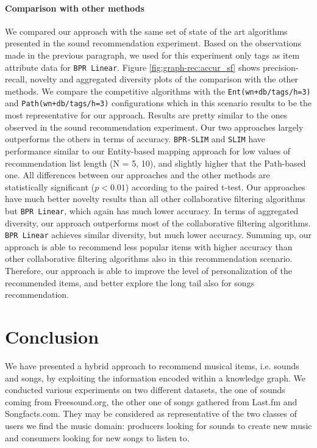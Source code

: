 \paragraph*{\textbf{Comparison with other methods}}\label{comp}
We compared our approach with the same set of state of the art algorithms presented in the sound recommendation experiment. Based on the observations made in the previous paragraph, we used for this experiment only tags as item attribute data for \texttt{BPR Linear}.
Figure \ref{fig:graph-rec:accur_sf} shows precision-recall, novelty and aggregated diversity plots of the comparison with the other methods. We compare the competitive algorithms with the \texttt{Ent(wn+db/tags/h=3)} and \texttt{Path(wn+db/tags/h=3)} configurations which in this scenario results to be the most representative for our approach. 
Results are pretty similar to the ones observed in the sound recommendation experiment. Our two approaches largely outperforms the others in terms of accuracy. \texttt{BPR-SLIM} and \texttt{SLIM} have performance similar to our Entity-based mapping approach for low values of recommendation list length (N = 5, 10), and slightly higher that the Path-based one. All differences between our approaches and the other methods are statistically significant ($p<0.01$) according to the paired t-test. Our approaches have much better novelty results than all other collaborative filtering algorithms but \texttt{BPR Linear}, which again has much lower accuracy. In terms of aggregated diversity, our approach outperforms most of the collaborative filtering algorithms. \texttt{BPR Linear} achieves similar diversity, but much lower accuracy.
Summing up, our approach is able to recommend less popular items with higher accuracy than other collaborative filtering algorithms also in this recommendation scenario. Therefore, our approach is able to improve the level of personalization of the recommended items, and  better explore the long tail also for songs recommendation.



\section{Conclusion}
\label{sec:graph-rec:conclusion}
We have presented a hybrid approach to recommend musical items, i.e. sounds and songs, by exploiting the information encoded within a knowledge graph. We conducted various experiments on two different datasets, the one of sounds coming from Freesound.org, the other one of songs gathered from Last.fm and Songfacts.com. They may be considered as representative of the two classes of users we find the music domain: producers looking for sounds to create new music and consumers looking for new songs to listen to.


